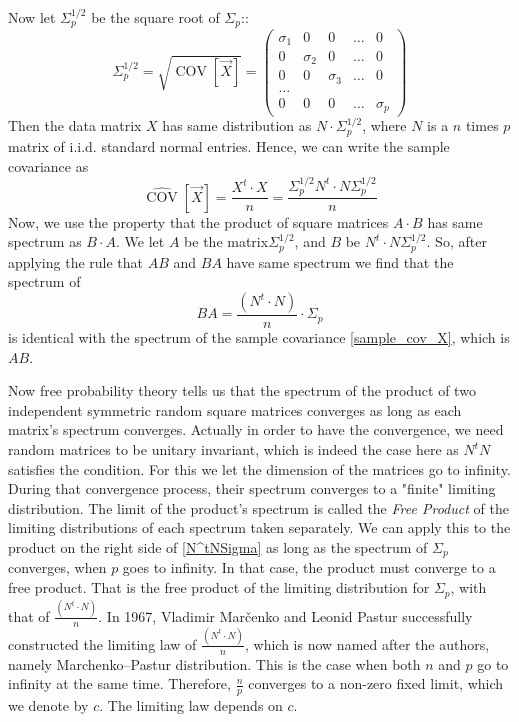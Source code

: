 \documentclass[12pt]{amsart}
\theoremstyle{definition}
\DeclareMathOperator{\Cov}{COV}
\numberwithin{equation}{section}
\numberwithin{equation}{section}
\theoremstyle{remark}
\numberwithin{equation}{section}
\begin{document}
Now let $\Sigma_p^{1/2}$ be the  square root of $\Sigma_p$::
$$\Sigma^{1/2}_p=\sqrt{\Cov[\vec{X}]}=\left(
\begin{array}{ccccccccc}
\sigma_1&0&0&\ldots&0\\
0&\sigma_2&0&\ldots&0\\
0&0&\sigma_3&\ldots&0\\
\ldots\\
0&0&0&\ldots&\sigma_p
\end{array}\right)$$
Then the data matrix $X$ has same distribution as $N\cdot \Sigma^{1/2}_p$,
where $N$ is a $n$ times $p$ matrix of i.i.d. standard normal entries.
Hence, we can write the sample covariance as
\begin{equation}
\label{sample_cov_X}
\hat{\Cov}[\vec{X}]=\frac{X^t\cdot X}{n}=\frac{\Sigma^{1/2}_p N^t\cdot N \Sigma^{1/2}_p}{n}
\end{equation}
Now, we use the property that the product of square matrices $A\cdot B$ has same spectrum as $B\cdot A$. We let $A$ be the matrix$\Sigma^{1/2}_p$, and $B$ be $N^t\cdot N \Sigma^{1/2}_p$. So, after applying the rule that $AB$ and $BA$ have same spectrum we find that the spectrum of
\begin{equation}
\label{N^tNSigma}
BA=\frac{(N^t\cdot N)}{n}\cdot \Sigma_p
\end{equation}
is identical with the spectrum of the sample covariance \ref{sample_cov_X}, which is $AB$.

Now free probability theory tells us that the spectrum of the product of two independent symmetric random square matrices converges as long as each matrix's spectrum converges. Actually in order to have the convergence, we need random matrices to be unitary invariant, which is indeed the case here as $N^t N$ satisfies the condition. For this we let the dimension of the matrices go to infinity. During that convergence process, their spectrum converges to a "finite" limiting distribution.  The limit of the product's spectrum is called the {\it Free Product} of the limiting distributions of each spectrum taken separately. We can apply this to the product on the right side of \ref{N^tNSigma} as long as the spectrum of $\Sigma_p$ converges, when $p$ goes to infinity. In that case, the product must converge to a free product. That is the free product of the limiting distribution for $\Sigma_p$, with that  of $\frac{(N^t\cdot N)}{n}$.
In 1967, Vladimir Mar{\v c}enko and Leonid Pastur \cite{marvcenko1967distribution} successfully constructed the limiting law of $\frac{(N^t\cdot N)}{n}$, which is now named after the authors, namely Marchenko–Pastur distribution. This is the case when both $n$ and $p$ go to infinity at the same time. Therefore, $\frac{n}{p}$ converges to a non-zero fixed limit, which we denote by $c$. The limiting law depends on $c$.
\end{document}
